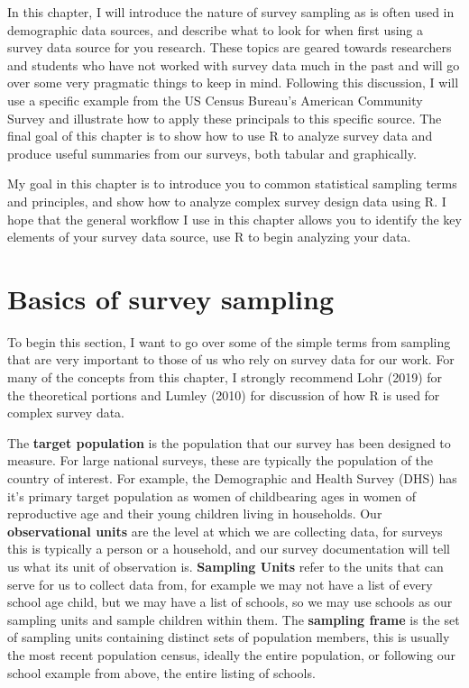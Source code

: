 \documentclass[
  letterpaper,
  DIV=11,
  numbers=noendperiod]{scrreprt}
\begin{document}
In this chapter, I will introduce the nature of survey sampling as is
often used in demographic data sources, and describe what to look for
when first using a survey data source for you research. These topics are
geared towards researchers and students who have not worked with survey
data much in the past and will go over some very pragmatic things to
keep in mind. Following this discussion, I will use a specific example
from the US Census Bureau's American Community Survey and illustrate how
to apply these principals to this specific source. The final goal of
this chapter is to show how to use R to analyze survey data and produce
useful summaries from our surveys, both tabular and graphically.

My goal in this chapter is to introduce you to common statistical
sampling terms and principles, and show how to analyze complex survey
design data using R. I hope that the general workflow I use in this
chapter allows you to identify the key elements of your survey data
source, use R to begin analyzing your data.

\hypertarget{basics-of-survey-sampling}{%
\section{Basics of survey sampling}\label{basics-of-survey-sampling}}

To begin this section, I want to go over some of the simple terms from
sampling that are very important to those of us who rely on survey data
for our work. For many of the concepts from this chapter, I strongly
recommend Lohr (2019) for the theoretical portions and Lumley (2010) for
discussion of how R is used for complex survey data.

The \textbf{target population} is the population that our survey has
been designed to measure. For large national surveys, these are
typically the population of the country of interest. For example, the
Demographic and Health Survey (DHS) has it's primary target population
as women of childbearing ages in women of reproductive age and their
young children living in households. Our \textbf{observational units}
are the level at which we are collecting data, for surveys this is
typically a person or a household, and our survey documentation will
tell us what its unit of observation is. \textbf{Sampling Units} refer
to the units that can serve for us to collect data from, for example we
may not have a list of every school age child, but we may have a list of
schools, so we may use schools as our sampling units and sample children
within them. The \textbf{sampling frame} is the set of sampling units
containing distinct sets of population members, this is usually the most
recent population census, ideally the entire population, or following
our school example from above, the entire listing of schools.
\end{document}
